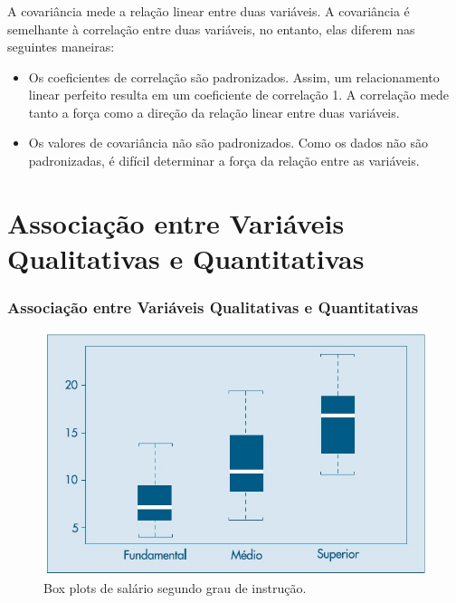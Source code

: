 \documentclass[14pt,aspectratio=1610]{beamer}
\begin{document}
\begin{frame}{}
\frametitle{}
A covariância mede a relação linear entre duas variáveis. A covariância é semelhante à correlação entre duas variáveis, no entanto, elas diferem nas seguintes maneiras:
\begin{itemize}
\item Os coeficientes de correlação são padronizados. Assim, um relacionamento linear perfeito resulta em um coeficiente de correlação 1. A correlação mede tanto a força como a direção da relação linear entre duas variáveis.\pause
\item Os valores de covariância não são padronizados. Como os dados não são padronizadas, é difícil determinar a força da relação entre as variáveis.
\end{itemize}
\end{frame}

\section{Associação entre Variáveis Qualitativas e Quantitativas}
\begin{frame}{}
\frametitle{Associação entre Variáveis Qualitativas e Quantitativas}
\begin{figure}[H]
    \centering
    \includegraphics[scale=0.5]{Figuras/boxplot}
    \caption{Box plots de salário segundo grau de instrução. \cite{Morettin09}}
  \end{figure}
\end{frame}
\end{document}
